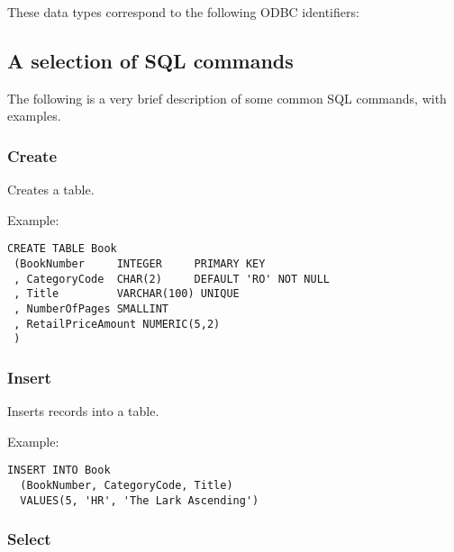 These data types correspond to the following ODBC identifiers:

\begin{twocollist}\itemsep=0pt
\end{twocollist}

\subsection{A selection of SQL commands}\label{sqlcommands}


The following is a very brief description of some common SQL commands, with
examples.

\subsubsection{Create}

Creates a table.

Example:

\begin{verbatim}
CREATE TABLE Book
 (BookNumber     INTEGER     PRIMARY KEY
 , CategoryCode  CHAR(2)     DEFAULT 'RO' NOT NULL
 , Title         VARCHAR(100) UNIQUE
 , NumberOfPages SMALLINT
 , RetailPriceAmount NUMERIC(5,2)
 )
\end{verbatim}

\subsubsection{Insert}

Inserts records into a table.

Example:

\begin{verbatim}
INSERT INTO Book
  (BookNumber, CategoryCode, Title)
  VALUES(5, 'HR', 'The Lark Ascending')
\end{verbatim}

\subsubsection{Select}

